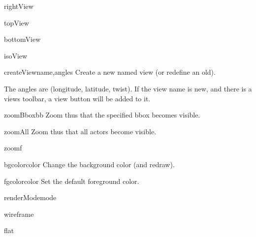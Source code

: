 \begin{funcdesc}{rightView}{}
\end{funcdesc}

\begin{funcdesc}{topView}{}
\end{funcdesc}

\begin{funcdesc}{bottomView}{}
\end{funcdesc}

\begin{funcdesc}{isoView}{}
\end{funcdesc}

\begin{funcdesc}{createView}{name,angles}
Create a new named view (or redefine an old).

The angles are (longitude, latitude, twist).
If the view name is new, and there is a views toolbar,
a view button will be added to it.

\end{funcdesc}

\begin{funcdesc}{zoomBbox}{bb}
Zoom thus that the specified bbox becomes visible.
\end{funcdesc}

\begin{funcdesc}{zoomAll}{}
Zoom thus that all actors become visible.
\end{funcdesc}

\begin{funcdesc}{zoom}{f}
\end{funcdesc}

\begin{funcdesc}{bgcolor}{color}
Change the background color (and redraw).
\end{funcdesc}

\begin{funcdesc}{fgcolor}{color}
Set the default foreground color.
\end{funcdesc}

\begin{funcdesc}{renderMode}{mode}
\end{funcdesc}

\begin{funcdesc}{wireframe}{}
\end{funcdesc}

\begin{funcdesc}{flat}{}
\end{funcdesc}

